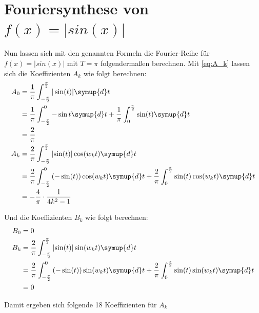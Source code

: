 \newpage
\section{Fouriersynthese von $f(x)=|sin(x)|$}

Nun lassen sich mit den genannten Formeln die Fourier-Reihe für $f(x)=|sin(x)|$ mit $T=\pi$ folgendermaßen berechnen. Mit \autoref{eq:A_k} lassen sich die Koeffizienten $A_k$ wie folgt berechnen:
\begin{align*}
  A_0 &= \frac{1}{\pi} \int_{-\frac{\pi}{2}}^{\frac{\pi}{2}} | \sin(t) | \symup{d}t \\
  &= \frac{1}{\pi} \int_{-\frac{\pi}{2}}^0 -\sin t \symup{d}t + \frac{1}{\pi} \int_0^{\frac{\pi}{2}} \sin(t) \symup{d}t \\
  &= \frac{2}{\pi} \\
  A_k &= \frac{2}{\pi} \int_{-\frac{\pi}{2}}^{\frac{\pi}{2}} \left| \sin(t) \right| \cos(w_kt) \symup{d}t \\
  &= \frac{2}{\pi} \int_{-\frac{\pi}{2}}^{0} \left( -\sin(t) \right) \cos(w_kt) \symup{d}t + \frac{2}{\pi} \int_{0}^{\frac{\pi}{2}} \sin(t) \cos(w_kt) \symup{d}t \\
  &= - \frac{4}{\pi} \cdot \frac{1}{4k^2-1}
\end{align*}

Und die Koeffizienten $B_k$ wie folgt berechnen:
\begin{align*}
  B_0 &= 0 \\
  B_k &= \frac{2}{\pi} \int_{-\frac{\pi}{2}}^{\frac{\pi}{2}} \left| \sin(t) \right| \sin(w_kt) \symup{d}t \\
  &= \frac{2}{\pi} \int_{-\frac{\pi}{2}}^{0} \left( -\sin(t) \right) \sin(w_kt) \symup{d}t + \frac{2}{\pi} \int_{0}^{\frac{\pi}{2}} \sin(t) \sin(w_kt) \symup{d}t \\
  &= 0
\end{align*}

Damit ergeben sich folgende 18 Koeffizienten für $A_k$

